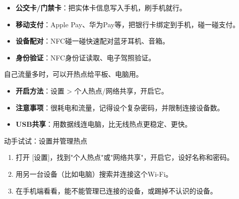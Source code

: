 
\begin{itemize}
  \item \textbf{公交卡/门禁卡}：把实体卡信息写入手机，刷手机就行。
  \item \textbf{移动支付}：Apple Pay、华为Pay等，把银行卡绑定到手机，碰一碰支付。
  \item \textbf{设备配对}：NFC碰一碰快速配对蓝牙耳机、音箱。
  \item \textbf{身份验证}：NFC身份证读取、电子驾照验证。
\end{itemize}


自己流量多时，可以开热点给平板、电脑用。

\begin{itemize}
  \item \textbf{开启方法}：设置 > 个人热点/网络共享，开启它。
  \item \textbf{注意事项}：很耗电和流量，记得设个复杂密码，并限制连接设备数。
  \item \textbf{USB共享}：用数据线连电脑，比无线热点更稳定、更快。
\end{itemize}

\begin{tcbpractice}{动手试试：设置并管理热点}
\begin{enumerate}
  \item 打开 [设置]，找到"个人热点"或"网络共享"，开启它，设好名称和密码。
  \item 用另一台设备（比如电脑）搜索并连接这个Wi-Fi。
  \item 在手机端看看，能不能管理已连接的设备，或踢掉不认识的设备。
\end{enumerate}

\end{tcbpractice}
